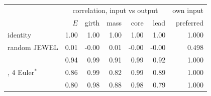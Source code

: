 \scriptsize
\setlength{\tabcolsep}{3pt}
\begin{tabular}{lrrrrrr}
\toprule
 & \multicolumn{5}{c}{correlation, input vs output} & own input \\
 & $E$ & girth & mass & core & lead & preferred \\
\midrule
identity & 1.00 & 1.00 & 1.00 & 1.00 & 1.00 & 1.000 \\
random JEWEL & 0.01 & -0.00 & 0.01 & -0.00 & -0.00 & 0.498 \\
\ot{} & 0.94 & 0.99 & 0.91 & 0.99 & 0.92 & 1.000 \\
\ot{}, 4 Euler$^\ast$ & 0.86 & 0.99 & 0.82 & 0.99 & 0.89 & 1.000 \\
\dsbm{} & 0.80 & 0.98 & 0.88 & 0.98 & 0.79 & 1.000 \\
\bottomrule
\end{tabular}
